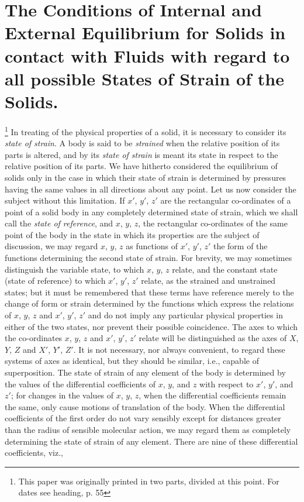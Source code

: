 \documentclass[12pt]{memoir}
\begin{document}
\section{The Conditions of Internal and External Equilibrium for Solids in contact with Fluids with regard to all possible States of Strain of the Solids.}\footnote{This paper was originally printed in two parts, divided at this point. For dates see heading, p. 55}
In treating of the physical properties of a solid, it is necessary to consider its \textit{state of strain}. A body is said to be \textit{strained} when the relative position of its parts is altered, and by its \textit{state of strain} is meant its state in respect to the relative position of its parts. We have hitherto considered the equilibrium of solids only in the case in which their state of strain is determined by pressures having the same values in all directions about any point. Let us now consider the subject without this limitation.
If $x'$, $y'$, $z'$ are the rectangular co-ordinates of a point of a solid body in any completely determined state of strain, which we shall call the \textit{state of reference}, and $x$, $y$, $z$, the rectangular co-ordinates of the same point of the body in the state in which its properties are the subject of discussion, we may regard $x$, $y$, $z$ as functions of $x'$, $y'$, $z'$ the form of the functions determining the second state of strain. For brevity, we may sometimes distinguish the variable state, to which $x$, $y$, $z$ relate, and the constant state (state of reference) to which $x'$, $y'$, $z'$ relate, as the strained and unstrained states; but it must be remembered that these terms have reference merely to the change of form or strain determined by the functions which express the relations of $x$, $y$, $z$ and $x'$, $y'$, $z'$ and do not imply any particular physical properties in either of the two states, nor prevent their possible coincidence. The axes to which the co-ordinates $x$, $y$, $z$ and $x'$, $y'$, $z'$ relate will be distinguished as the axes of $X$, $Y$, $Z$ and $X'$, $Y'$, $Z'$. It is not necessary, nor always convenient, to regard these systems of axes as identical, but they should be similar, i.e., capable of superposition.
The state of strain of any element of the body is determined by the values of the differential coefficients of $x$, $y$, and $z$ with respect to $x'$, $y'$, and $z'$; for changes in the values of $x$, $y$, $z$, when the differential coefficients remain the same, only cause motions of translation of the body. When the differential coefficients of the first order do not vary sensibly except for distances greater than the radius of sensible molecular action, we may regard them as completely determining the state of strain of any element. There are nine of these differential coefficients, viz.,
\end{document}
